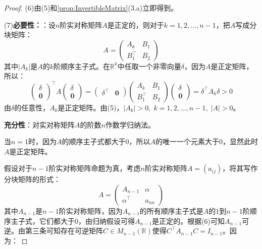 \begin{proof}
	(6)由(5)和\cref{prop:InvertibleMatrix}(3.a)立即得到。\par
	(7)\textbf{必要性：}：设$n$阶实对称矩阵$A$是正定的，则对于$k=1,2,\dots,n-1$，把$A$写成分块矩阵：
	\begin{equation*}
		A=
		\begin{pmatrix}
			A_k & B_1 \\
			B_1^{\top} & B_2
		\end{pmatrix}
	\end{equation*}
	其中$|A_k|$是$A$的$k$阶顺序主子式。在$\mathbb{R}^{k}$中任取一个非零向量$\delta$，因为$A$是正定矩阵，所以：
	\begin{equation*}
		\begin{pmatrix}
			\delta \\
			\mathbf{0}
		\end{pmatrix}^{\top}
		A
		\begin{pmatrix}
			\delta \\
			\mathbf{0}
		\end{pmatrix}
		=
		\begin{pmatrix}
			\delta^{\top} & \mathbf{0}
		\end{pmatrix}
		\begin{pmatrix}
			A_k & B_1 \\
			B_1^{\top} & B_2
		\end{pmatrix}
		\begin{pmatrix}
			\delta \\
			\mathbf{0}
		\end{pmatrix}
		=\delta^{\top}A_k\delta>0
	\end{equation*}
	由$\delta$的任意性，$A_k$是正定矩阵。由(5)，$|A_k|>0,\;k=1,2,\dots,n-1,\;|A|>0$。\par
	\textbf{充分性}：对实对称矩阵$A$的阶数$n$作数学归纳法。\par
	当$n=1$时，因为$A$的顺序主子式都大于$0$，所以$A$的唯一一个元素大于$0$，显然此时$A$是正定矩阵。\par
	假设对于$n-1$阶实对称矩阵命题为真，考虑$n$阶实对称矩阵$A=(a_{ij})$，将其写作分块矩阵的形式：
	\begin{equation*}
		A=
		\begin{pmatrix}
			A_{n-1} & \alpha \\
			\alpha^{\top} & a_{nn}
		\end{pmatrix}
	\end{equation*}
	其中$A_{n-1}$是$n-1$阶实对称矩阵，因为$A_{n-1}$的所有顺序主子式是$A$的$1$到$n-1$阶顺序主子式，它们都大于$0$，由归纳假设可得$A_{n-1}$是正定的。根据(6)可知$A_{n-1}$可逆。由第三条可知存在可逆矩阵$C\in M_{n-1}(\mathbb{R})$使得$C^{\top}A_{n-1}C=I_{n-1}$。因为：

\end{proof}
